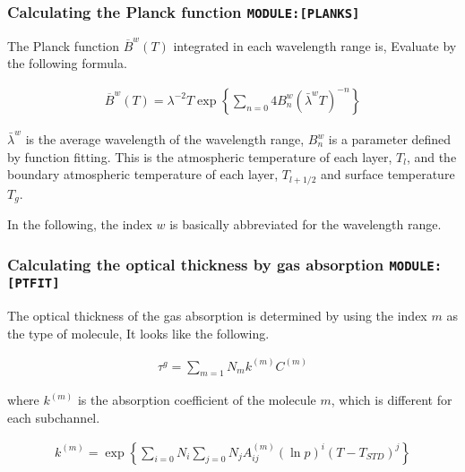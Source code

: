 \hypertarget{calculating-the-planck-function-moduleplanks}{%
\subsubsection{\texorpdfstring{Calculating the Planck function
\texttt{MODULE:{[}PLANKS{]}}}{Calculating the Planck function MODULE:{[}PLANKS{]}}}\label{calculating-the-planck-function-moduleplanks}}

The Planck function \(\overline{B}^w(T)\) integrated in each wavelength
range is, Evaluate by the following formula.

\begin{eqnarray}
  \overline{B}^w(T) 
   = \lambda^{-2} T \exp \left\{ \sum_{n=0}{4} B^w_n (\bar{\lambda}^w T)^{-n}
                         \right\}
\end{eqnarray}

\(\bar{\lambda}^w\) is the average wavelength of the wavelength range,
\(B^w_n\) is a parameter defined by function fitting. This is the
atmospheric temperature of each layer, \(T_l\), and the boundary
atmospheric temperature of each layer, \(T_{l+1/2}\) and surface
temperature \(T_g\).

In the following, the index \(w\) is basically abbreviated for the
wavelength range.

\hypertarget{calculating-the-optical-thickness-by-gas-absorption-moduleptfit}{%
\subsubsection{\texorpdfstring{Calculating the optical thickness by gas
absorption
\texttt{MODULE:{[}PTFIT{]}}}{Calculating the optical thickness by gas absorption MODULE:{[}PTFIT{]}}}\label{calculating-the-optical-thickness-by-gas-absorption-moduleptfit}}

The optical thickness of the gas absorption is determined by using the
index \(m\) as the type of molecule, It looks like the following.

\begin{eqnarray}
  \tau^g = \sum_{m=1}{N_m} k^{(m)} C^{(m)}
\end{eqnarray}

where \(k^{(m)}\) is the absorption coefficient of the molecule \(m\),
which is different for each subchannel.

\begin{eqnarray}
 k^{(m)} = \exp\left\{ \sum_{i=0}{N_i} \sum_{j=0}{N_j} A^{(m)}_{ij}
                   (\ln p)^{i} (T-T_{STD})^{j}
               \right\}
\end{eqnarray}

